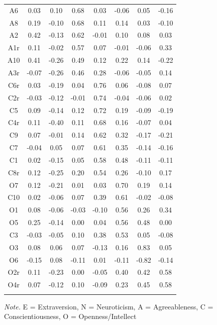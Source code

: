 \documentclass[
  english,
  man]{apa6}
\begin{document}
\begin{table}[tbp]
\begin{center}
\begin{threeparttable}
{\begin{tabular}{cccccccc}
A6 & 0.03 & 0.10 & 0.68 & 0.03 & -0.06 & 0.05 & -0.16\\
A8 & 0.19 & -0.10 & 0.68 & 0.11 & 0.14 & 0.03 & -0.10\\
A2 & 0.42 & -0.13 & 0.62 & -0.01 & 0.10 & 0.08 & 0.03\\
A1r & 0.11 & -0.02 & 0.57 & 0.07 & -0.01 & -0.06 & 0.33\\
A10 & 0.41 & -0.26 & 0.49 & 0.12 & 0.22 & 0.14 & -0.22\\
A3r & -0.07 & -0.26 & 0.46 & 0.28 & -0.06 & -0.05 & 0.14\\
C6r & 0.03 & -0.19 & 0.04 & 0.76 & 0.06 & -0.08 & 0.07\\
C2r & -0.03 & -0.12 & -0.01 & 0.74 & -0.04 & -0.06 & 0.02\\
C5 & 0.09 & -0.14 & 0.12 & 0.72 & 0.19 & -0.09 & -0.19\\
C4r & 0.11 & -0.40 & 0.11 & 0.68 & 0.16 & -0.07 & 0.04\\
C9 & 0.07 & -0.01 & 0.14 & 0.62 & 0.32 & -0.17 & -0.21\\
C7 & -0.04 & 0.05 & 0.07 & 0.61 & 0.35 & -0.14 & -0.16\\
C1 & 0.02 & -0.15 & 0.05 & 0.58 & 0.48 & -0.11 & -0.11\\
C8r & 0.12 & -0.25 & 0.20 & 0.54 & 0.26 & -0.10 & 0.17\\
O7 & 0.12 & -0.21 & 0.01 & 0.03 & 0.70 & 0.19 & 0.14\\
C10 & 0.02 & -0.06 & 0.07 & 0.39 & 0.61 & -0.02 & -0.08\\
O1 & 0.08 & -0.06 & -0.03 & -0.10 & 0.56 & 0.26 & 0.34\\
O5 & 0.25 & -0.14 & 0.00 & 0.04 & 0.56 & 0.48 & 0.00\\
C3 & -0.03 & -0.05 & 0.10 & 0.38 & 0.53 & 0.05 & -0.08\\
O3 & 0.08 & 0.06 & 0.07 & -0.13 & 0.16 & 0.83 & 0.05\\
O6 & -0.15 & 0.08 & -0.11 & 0.01 & -0.11 & -0.82 & -0.14\\
O2r & 0.11 & -0.23 & 0.00 & -0.05 & 0.40 & 0.42 & 0.58\\
O4r & 0.07 & -0.12 & 0.10 & -0.09 & 0.23 & 0.45 & 0.58\\
\bottomrule
\addlinespace
\end{tabular}

}

\begin{tablenotes}[para]
\normalsize{\textit{Note.} E = Extraversion, N = Neuroticism, A = Agreeableness, C = Conscientiousness, O = Openness/Intellect}
\end{tablenotes}

\end{threeparttable}
\end{center}

\end{table}
\end{document}
